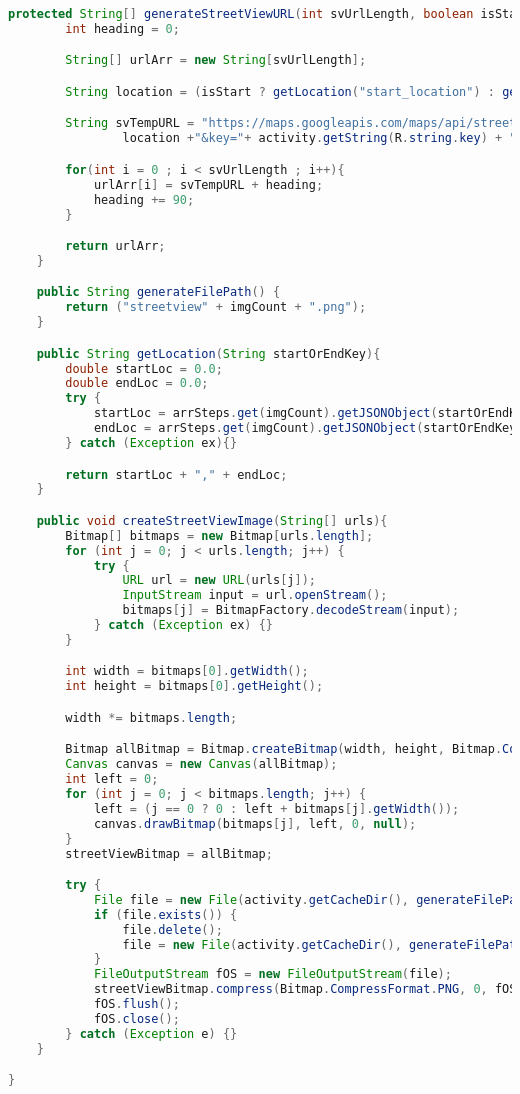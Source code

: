\begin{lstlisting}[language=Java,caption=StreetViewLoader.java]
    protected String[] generateStreetViewURL(int svUrlLength, boolean isStart){
        int heading = 0;

        String[] urlArr = new String[svUrlLength];

        String location = (isStart ? getLocation("start_location") : getLocation("end_location"));

        String svTempURL = "https://maps.googleapis.com/maps/api/streetview?size=600x300&location="+
                location +"&key="+ activity.getString(R.string.key) + "&heading=";

        for(int i = 0 ; i < svUrlLength ; i++){
            urlArr[i] = svTempURL + heading;
            heading += 90;
        }

        return urlArr;
    }

    public String generateFilePath() {
        return ("streetview" + imgCount + ".png");
    }

    public String getLocation(String startOrEndKey){
        double startLoc = 0.0;
        double endLoc = 0.0;
        try {
            startLoc = arrSteps.get(imgCount).getJSONObject(startOrEndKey).getDouble("lat");
            endLoc = arrSteps.get(imgCount).getJSONObject(startOrEndKey).getDouble("lng");
        } catch (Exception ex){}

        return startLoc + "," + endLoc;
    }

    public void createStreetViewImage(String[] urls){
        Bitmap[] bitmaps = new Bitmap[urls.length];
        for (int j = 0; j < urls.length; j++) {
            try {
                URL url = new URL(urls[j]);
                InputStream input = url.openStream();
                bitmaps[j] = BitmapFactory.decodeStream(input);
            } catch (Exception ex) {}
        }

        int width = bitmaps[0].getWidth();
        int height = bitmaps[0].getHeight();

        width *= bitmaps.length;

        Bitmap allBitmap = Bitmap.createBitmap(width, height, Bitmap.Config.ARGB_8888);
        Canvas canvas = new Canvas(allBitmap);
        int left = 0;
        for (int j = 0; j < bitmaps.length; j++) {
            left = (j == 0 ? 0 : left + bitmaps[j].getWidth());
            canvas.drawBitmap(bitmaps[j], left, 0, null);
        }
        streetViewBitmap = allBitmap;

        try {
            File file = new File(activity.getCacheDir(), generateFilePath());
            if (file.exists()) {
                file.delete();
                file = new File(activity.getCacheDir(), generateFilePath());
            }
            FileOutputStream fOS = new FileOutputStream(file);
            streetViewBitmap.compress(Bitmap.CompressFormat.PNG, 0, fOS);
            fOS.flush();
            fOS.close();
        } catch (Exception e) {}
    }

}
\end{lstlisting}

